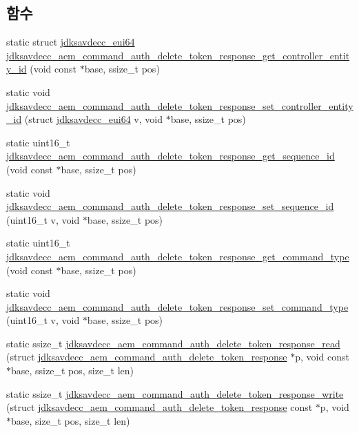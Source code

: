 \subsection*{함수}
\begin{DoxyCompactItemize}
\item 
static struct \hyperlink{structjdksavdecc__eui64}{jdksavdecc\+\_\+eui64} \hyperlink{group__command__auth__delete__token__response_ga77807ce2affc05f84a961add3954256a}{jdksavdecc\+\_\+aem\+\_\+command\+\_\+auth\+\_\+delete\+\_\+token\+\_\+response\+\_\+get\+\_\+controller\+\_\+entity\+\_\+id} (void const $\ast$base, ssize\+\_\+t pos)
\item 
static void \hyperlink{group__command__auth__delete__token__response_gac753d5cc9d502d2ec7e84c5835c97fc0}{jdksavdecc\+\_\+aem\+\_\+command\+\_\+auth\+\_\+delete\+\_\+token\+\_\+response\+\_\+set\+\_\+controller\+\_\+entity\+\_\+id} (struct \hyperlink{structjdksavdecc__eui64}{jdksavdecc\+\_\+eui64} v, void $\ast$base, ssize\+\_\+t pos)
\item 
static uint16\+\_\+t \hyperlink{group__command__auth__delete__token__response_gad821e27a3a4630e0878ae8e2ff8d25cb}{jdksavdecc\+\_\+aem\+\_\+command\+\_\+auth\+\_\+delete\+\_\+token\+\_\+response\+\_\+get\+\_\+sequence\+\_\+id} (void const $\ast$base, ssize\+\_\+t pos)
\item 
static void \hyperlink{group__command__auth__delete__token__response_gabcae247f597f2f959c78d54f102b6a74}{jdksavdecc\+\_\+aem\+\_\+command\+\_\+auth\+\_\+delete\+\_\+token\+\_\+response\+\_\+set\+\_\+sequence\+\_\+id} (uint16\+\_\+t v, void $\ast$base, ssize\+\_\+t pos)
\item 
static uint16\+\_\+t \hyperlink{group__command__auth__delete__token__response_ga8aea31dbad7756c955a1ac94c0092ab6}{jdksavdecc\+\_\+aem\+\_\+command\+\_\+auth\+\_\+delete\+\_\+token\+\_\+response\+\_\+get\+\_\+command\+\_\+type} (void const $\ast$base, ssize\+\_\+t pos)
\item 
static void \hyperlink{group__command__auth__delete__token__response_gacab9be8d4cfa2c646a55691f1f1fe9c9}{jdksavdecc\+\_\+aem\+\_\+command\+\_\+auth\+\_\+delete\+\_\+token\+\_\+response\+\_\+set\+\_\+command\+\_\+type} (uint16\+\_\+t v, void $\ast$base, ssize\+\_\+t pos)
\item 
static ssize\+\_\+t \hyperlink{group__command__auth__delete__token__response_gac6a9f33c151d0ad8a60234187af34350}{jdksavdecc\+\_\+aem\+\_\+command\+\_\+auth\+\_\+delete\+\_\+token\+\_\+response\+\_\+read} (struct \hyperlink{structjdksavdecc__aem__command__auth__delete__token__response}{jdksavdecc\+\_\+aem\+\_\+command\+\_\+auth\+\_\+delete\+\_\+token\+\_\+response} $\ast$p, void const $\ast$base, ssize\+\_\+t pos, size\+\_\+t len)
\item 
static ssize\+\_\+t \hyperlink{group__command__auth__delete__token__response_ga192548e78cc026f0ec1084fea543146a}{jdksavdecc\+\_\+aem\+\_\+command\+\_\+auth\+\_\+delete\+\_\+token\+\_\+response\+\_\+write} (struct \hyperlink{structjdksavdecc__aem__command__auth__delete__token__response}{jdksavdecc\+\_\+aem\+\_\+command\+\_\+auth\+\_\+delete\+\_\+token\+\_\+response} const $\ast$p, void $\ast$base, size\+\_\+t pos, size\+\_\+t len)
\end{DoxyCompactItemize}


